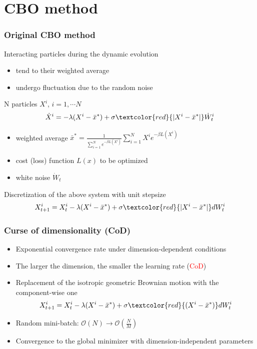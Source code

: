 \documentclass{beamer}
\begin{document}
\section{CBO method}
\begin{frame}
	\frametitle{Original CBO method}
	
   Interacting particles during the dynamic evolution
   \begin{itemize}
   	\item tend to their weighted average
   	\item undergo fluctuation due to the random noise 
   \end{itemize}

	N particles $X^i$, $i =1, \cdots N$
   \begin{equation*}
   		\dot X^i = -\lambda (X^i - \bar{x}^*) +\sigma \textcolor{red}{|X^i-\bar{x}^*|} \dot W^i_t
   \end{equation*}
   \begin{itemize}
   	\item[] weighted average $\bar{x}^* = \frac{1}{\sum_{i=1}^N e^{-\beta L(X^i)}}\sum_{i=1}^N X^i e^{-\beta L(X^i)}$ 
   	\item[] cost (loss) function $L(x)$ to be optimized
   	\item[] white noise $\dot W_t$
   \end{itemize}
   Discretization of the above system with unit stepsize 
   \begin{equation*}
   		X^i_{t+1} =  X^i_{t} -\lambda (X^i - \bar{x}^*) +\sigma \textcolor{red}{|X^i-\bar{x}^*|}  dW^i_t
   \end{equation*}
\end{frame}

\begin{frame}
\frametitle{Curse of dimensionality (CoD)}

\begin{itemize}
	\item Exponential convergence rate under dimension-dependent conditions 
	\item The larger the dimension, the smaller the learning rate (\textcolor{red}{CoD})
	\item Replacement of the isotropic geometric Brownian motion with the component-wise one 
	\begin{equation*}
	X^i_{t+1} =  X^i_{t} -\lambda (X^i - \bar{x}^*) +\sigma \textcolor{red}{(X^i-\bar{x}^*)}  dW^i_t
	\end{equation*}
	\item[] Random mini-batch: $\mathcal{O}(N) \rightarrow \mathcal{O}(\frac{N}{M})$
	\item Convergence to the global minimizer with dimension-independent parameters 
\end{itemize}
\end{frame}
\end{document}
